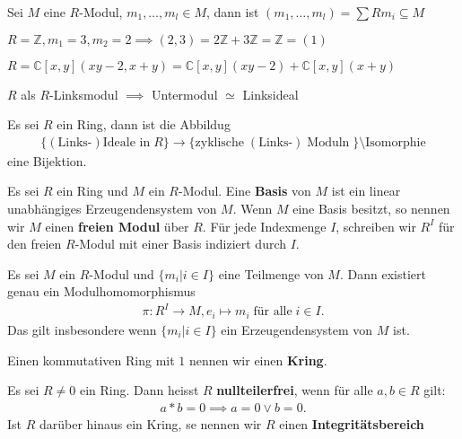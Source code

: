 \documentclass[../Algebra_script.tex]{subfiles}
\begin{document}
    \begin{example}
        Sei $M$ eine $R$-Modul, $m_1, \ldots, m_{l} \in M$, dann ist $(m_1, \ldots, m_{l}) = \sum Rm_{i} \subseteq M$ 

        $R = \mathbb{Z}, m_1 = 3, m_2 = 2 \implies (2, 3) = 2\mathbb{Z} + 3\mathbb{Z} = \mathbb{Z} = (1)$ 

        $R = \mathbb{C}[x, y] (xy - 2, x + y) = \mathbb{C}[x,y](xy - 2) + \mathbb{C}[x,y](x + y)$

        $R$ als $R$-Linksmodul $\implies$ Untermodul $\simeq$ Linksideal
    \end{example}

    \begin{proposition}
        Es sei $R$ ein Ring, dann ist die Abbildug
        \begin{align*}
            \{(\text{Links-})\text{Ideale in}\; R\} \to \{\text{zyklische}\;(\text{Links-})\;\text{Moduln}\;\}\setminus\text{Isomorphie}
        \end{align*}
        eine Bijektion.
    \end{proposition}
    
    \begin{definition}
        Es sei $R$ ein Ring und $M$ ein $R$-Modul. Eine \textbf{Basis} von  $M$ ist ein linear unabhängiges Erzeugendensystem von $M$.
        Wenn $M$ eine Basis besitzt, so nennen wir $M$ einen \textbf{freien Modul} über $R$. Für jede Indexmenge $I$, schreiben wir $R^I$ für den freien
        $R$-Modul mit einer Basis indiziert durch $I$.
    \end{definition}

    \begin{proposition}
        Es sei $M$ ein $R$-Modul und $\{m_{i}|i\in I\}$ eine Teilmenge von $M$. Dann existiert genau ein Modulhomomorphismus
        \begin{align*}
            \pi: R^I \to M, e_{i} \mapsto m_{i} \; \text{für alle}\; i \in I
        .\end{align*}
        Das gilt insbesondere wenn $\{m_{i}| i \in I\}$ ein Erzeugendensystem von $M$ ist.
    \end{proposition}

    \begin{definition}[Kring]
        Einen kommutativen Ring mit $1$ nennen wir einen \textbf{Kring}.
    \end{definition}

    \begin{definition}
        Es sei $R \neq 0$ ein Ring. Dann heisst $R$ \textbf{nullteilerfrei}, wenn für alle $a, b \in R$ gilt:
        \begin{align*}
            a*b = 0 \implies a = 0 \vee b = 0
        .\end{align*}
        Ist $R$ darüber hinaus ein Kring, se nennen wir $R$ einen \textbf{Integritätsbereich}
    \end{definition}
\end{document}
